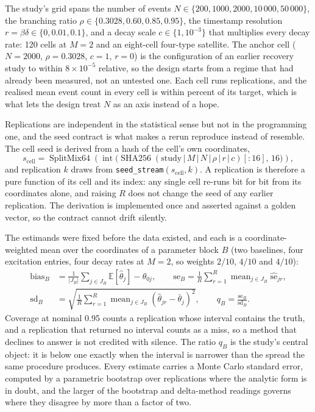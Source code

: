 The study's grid spans the number of events $N \in \{200, 1000, 2000, 10\,000,
50\,000\}$, the branching ratio $\rho \in \{0.3028, 0.60, 0.85, 0.95\}$, the
timestamp resolution $r = \beta\delta \in \{0, 0.01, 0.1\}$, and a decay scale
$c \in \{1, 10^{-3}\}$ that multiplies every decay rate: 120 cells at $M = 2$ and
an eight-cell four-type satellite. The anchor cell ($N = 2000$, $\rho = 0.3028$,
$c = 1$, $r = 0$) is the configuration of an earlier recovery study to within
$8 \times 10^{-5}$ relative, so the design starts from a regime that had already
been measured, not an untested one. Each cell runs
\HsixReplications{} replications, and the realised mean event count in every cell
is within \ThCountTolerance{} percent of its target, which is what lets the design
treat $N$ as an axis instead of a hope.

Replications are independent in the statistical sense but not in the programming
one, and the seed contract is what makes a rerun reproduce instead of resemble. The
cell seed is derived from a hash of the cell's own coordinates,
\begin{equation}
s_{\text{cell}} = \operatorname{SplitMix64}\!\left(
  \operatorname{int}\big(\operatorname{SHA256}(\text{study}\,|\,M\,|\,N\,|\,\rho\,|\,r\,|\,c)[:16],\,16\big)
\right),
\end{equation}
and replication $k$ draws from \texttt{seed\_stream}$(s_{\text{cell}}, k)$. A
replication is therefore a pure function of its cell and its index: any single
cell re-runs bit for bit from its coordinates alone, and raising $R$ does not
change the seed of any earlier replication. The derivation is implemented once and
asserted against a golden vector, so the contract cannot drift silently.

The estimands were fixed before the data existed, and each is a coordinate-weighted
mean over the coordinates of a parameter block $B$ (two baselines, four excitation
entries, four decay rates at $M = 2$, so weights $2/10$, $4/10$ and $4/10$):
\begin{align}
\text{bias}_B &= \frac{1}{|J_B|}\sum_{j \in J_B} \mathbb{E}[\hat\theta_j] - \theta_{0j}, \qquad
\text{se}_B = \frac{1}{R}\sum_{r=1}^{R} \operatorname{mean}_{j \in J_B} \hat{\text{se}}_{jr}, \\
\text{sd}_B &= \sqrt{\frac{1}{R}\sum_{r=1}^{R} \operatorname{mean}_{j \in J_B}
(\hat\theta_{jr} - \bar\theta_j)^2}, \qquad
q_B = \frac{\text{se}_B}{\text{sd}_B}.
\end{align}
Coverage at nominal 0.95 counts a replication whose interval contains the truth,
and a replication that returned no interval counts as a miss, so a method that
declines to answer is not credited with silence. The ratio $q_B$ is the study's
central object: it is below one exactly when the interval is narrower than the
spread the same procedure produces. Every estimate carries a Monte Carlo standard
error, computed by a parametric bootstrap over replications where the analytic form
is in doubt, and the larger of the bootstrap and delta-method readings governs
where they disagree by more than a factor of two.


